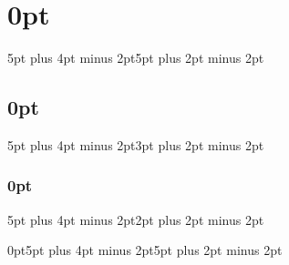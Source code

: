 
\setlength{}
\setlength{}
\setlength{}

\usepackage{titlesec}
\titlespacing\section{0pt}{5pt plus 4pt minus 2pt}{5pt plus 2pt minus 2pt}
\titlespacing\subsection{0pt}{5pt plus 4pt minus 2pt}{3pt plus 2pt minus 2pt}
\titlespacing\subsubsection{0pt}{5pt plus 4pt minus 2pt}{2pt plus 2pt minus 2pt}
\titlespacing\item{0pt}{5pt plus 4pt minus 2pt}{5pt plus 2pt minus 2pt}

\usepackage{enumitem}

